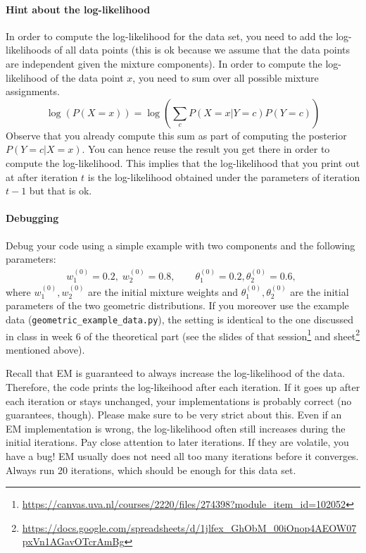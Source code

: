 \documentclass[11pt, a4paper]{article}
\begin{document}
\paragraph{Hint about the log-likelihood} 
In order to compute the log-likelihood for the data set, you need to add the log-likelihoods of all data points (this is
ok because we assume that the data points are independent given the mixture components). In order to compute the log-likelihood of the data point $ x $, you need
to sum over all possible mixture assignments.
\begin{equation}
\log(P(X=x)) = \log\left(\sum_{c} P(X=x|Y=c) P(Y=c)\right)
\end{equation}
Observe that you already compute this sum as part of computing the posterior $ P(Y=c|X=x) $. You can hence reuse the result you get there in order to compute the 
log-likelihood. This implies that the log-likelihood that you print out at after iteration $ t $ is the log-likelihood obtained under the parameters of iteration
$ t-1 $ but that is ok.


\paragraph{Debugging}

Debug your code using a simple example with two components and the following parameters:
\begin{align}
  w_1^{(0)} = 0.2, \; w_2^{(0)} = 0.8, \qquad \theta_1^{(0)} = 0.2, \theta_2^{(0)} = 0.6,\;
\end{align}
where $w_1^{(0)}, w_2^{(0)}$ are the initial mixture weights and $\theta_1^{(0)}, \theta_2^{(0)}$ are the initial parameters of the two geometric distributions.
If you moreover use the example data (\texttt{geometric\_example\_data.py}), the setting is identical to the one discussed in class in week 6 of the theoretical part (see the slides of that session\footnote{\href{https://canvas.uva.nl/courses/2220/files/274398?module_item_id=102052}{https://canvas.uva.nl/courses/2220/files/274398?module\_item\_id=102052}} and  sheet\footnote{\href{https://docs.google.com/spreadsheets/d/1jlfex_GhObM_00iOnop4AEOW07pxVn1AGavOTcrAmBg}{https://docs.google.com/spreadsheets/d/1jlfex\_GhObM\_00iOnop4AEOW07pxVn1AGavOTcrAmBg}} mentioned above).


Recall that EM is guaranteed to always increase the log-likelihood of the data. Therefore, the code prints the log-likeihood after each iteration.
If it goes up after each iteration or stays unchanged, your implementations is probably correct (no guarantees, though). Please make sure to be very strict about
this. Even if an EM implementation is wrong, the log-likelihood often still increases during the initial iterations. Pay close attention to later iterations. If they
are volatile, you have a bug! EM usually does not need all too many iterations before it converges. Always run 20 iterations, which should be enough for 
this data set.
\end{document}
